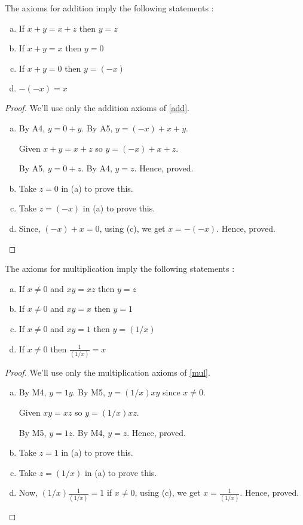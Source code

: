 \begin{prop}
	\label{addprop}
	The axioms for addition imply the following statements :
	\begin{enumerate}[a)]
		\item If $x + y = x + z$ then $y = z$
		\item If $x + y = x$ then $y = 0$
		\item If $x + y = 0$ then $y = (-x)$
		\item $-(-x) = x$
	\end{enumerate}
\end{prop}

\begin{proof}
	We'll use only the addition axioms of \ref{add}.
	\begin{enumerate}[a)]
		\item
			By A4, $y = 0 + y$.
			By A5, $y = (-x) + x + y$.

			Given $x + y = x + z$ so $y = (-x) + x + z$.

			By A5, $y = 0 + z$. By A4, $y = z$. Hence, proved.

		\item Take $z = 0$ in (a) to prove this.
		\item Take $z = (-x)$ in (a) to prove this.
		\item Since, $(-x) + x = 0$, using (c), we get $x = -(-x)$. Hence, proved.
	\end{enumerate}
\end{proof}


\begin{prop}
	\label{mulprop}
	The axioms for multiplication imply the following statements :
	\begin{enumerate}[a)]
		\item If $x \neq 0$ and $xy = xz$ then $y = z$
		\item If $x \neq 0$ and $xy = x$ then $y = 1$
		\item If $x \neq 0$ and $xy = 1$ then $y = (1/x)$
		\item If $x \neq 0$ then $\frac{1}{(1/x)}= x$
	\end{enumerate}
\end{prop}


\begin{proof}
	We'll use only the multiplication axioms of \ref{mul}.
	\begin{enumerate}[a)]
		\item
			By M4, $y = 1y$.
			By M5, $y = (1/x) x y$ since $x \neq 0$.

			Given $xy = xz$ so $y = (1/x) x z$.

			By M5, $y = 1z$. By M4, $y = z$. Hence, proved.

		\item Take $z = 1$ in (a) to prove this.
		\item Take $z = (1/x)$ in (a) to prove this.
		\item Now, $(1/x) \frac{1}{(1/x)} = 1$ if $x \neq 0$, using (c),
		we get $x = \frac{1}{(1/x)}$. Hence, proved.
	\end{enumerate}
\end{proof}


